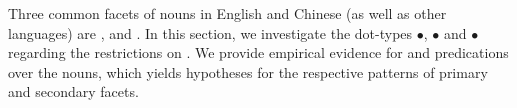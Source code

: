 \documentclass[output=paper,colorlinks,citecolor=brown,chinesefont]{langscibook}
\begin{document}
Three common facets of  nouns in English and Chinese (as well as other languages) are , and .
In this section, we investigate the dot-types $\bullet$, $\bullet$ and $\bullet$ regarding the restrictions on . We provide empirical evidence for  and  predications over the  nouns, which yields hypotheses for the respective patterns of primary and secondary facets.

\subsection{\dott{}}

%
\end{document}
